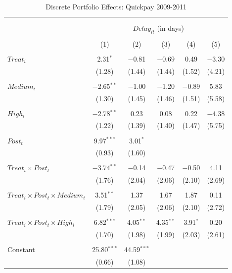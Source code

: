\documentclass[
]{article}
\begin{document}
\begin{table}[H] \centering 
  \caption{Discrete Portfolio Effects: Quickpay 2009-2011} 
  \label{} 
\small 
\begin{tabular}{@{\extracolsep{-2pt}}lccccc} 
\\[-1.8ex]\hline 
\hline \\[-1.8ex] 
\\[-1.8ex] & \multicolumn{5}{c}{$Delay_{it}$ (in days)} \\ 
\\[-1.8ex] & (1) & (2) & (3) & (4) & (5)\\ 
\hline \\[-1.8ex] 
 $Treat_i$ & 2.31$^{*}$ & $-$0.81 & $-$0.69 & 0.49 & $-$3.30 \\ 
  & (1.28) & (1.44) & (1.44) & (1.52) & (4.21) \\ 
  & & & & & \\ 
 $Medium_i$ & $-$2.65$^{**}$ & $-$1.00 & $-$1.20 & $-$0.89 & 5.83 \\ 
  & (1.30) & (1.45) & (1.46) & (1.51) & (5.58) \\ 
  & & & & & \\ 
 $High_i$ & $-$2.78$^{**}$ & 0.23 & 0.08 & 0.22 & $-$4.38 \\ 
  & (1.22) & (1.39) & (1.40) & (1.47) & (5.75) \\ 
  & & & & & \\ 
 $Post_t$ & 9.97$^{***}$ & 3.01$^{*}$ &  &  &  \\ 
  & (0.93) & (1.60) &  &  &  \\ 
  & & & & & \\ 
 $Treat_i \times Post_t$ & $-$3.74$^{**}$ & $-$0.14 & $-$0.47 & $-$0.50 & 4.11 \\ 
  & (1.76) & (2.04) & (2.06) & (2.10) & (2.69) \\ 
  & & & & & \\ 
 $Treat_i \times Post_t \times Medium_i$ & 3.51$^{**}$ & 1.37 & 1.67 & 1.87 & 0.11 \\ 
  & (1.79) & (2.05) & (2.06) & (2.10) & (2.72) \\ 
  & & & & & \\ 
 $Treat_i \times Post_t \times High_i$ & 6.82$^{***}$ & 4.05$^{**}$ & 4.35$^{**}$ & 3.91$^{*}$ & 0.20 \\ 
  & (1.70) & (1.98) & (1.99) & (2.03) & (2.61) \\ 
  & & & & & \\ 
 Constant & 25.80$^{***}$ & 44.59$^{***}$ &  &  &  \\ 
  & (0.66) & (1.08) &  &  &  \\ 

\end{tabular}
\end{table}
\end{document}
